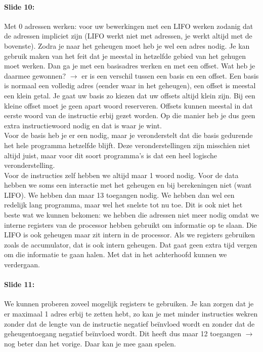 \documentclass[10pt,a4paper]{book}
\begin{document}
\paragraph{Slide 10:} Met 0 adressen werken: voor uw bewerkingen met een LIFO werken zodanig dat de adressen impliciet zijn (LIFO werkt niet met adressen, je werkt altijd met de bovenste). Zodra je naar het geheugen moet heb je wel een adres nodig. Je kan gebruik maken van het feit dat je meestal in hetzelfde gebied van het gehugen moet werken. Dan ga je met een basisadres werken en met een offset. Wat heb je daarmee gewonnen? $\rightarrow$ er is een verschil tussen een basis en een offset. Een basis is normaal een volledig adres (eender waar in het geheugen), een offset is meestal een klein getal. Je gaat uw basis zo kiezen dat uw offsets altijd klein zijn. Bij een kleine offset moet je geen apart woord reserveren. Offsets kunnen meestal in dat eerste woord van de instructie erbij gezet worden. Op die manier heb je dus geen extra instructiewoord nodig en dat is waar je wint.\\
Voor de basis heb je er een nodig, maar je veronderstelt dat die basis gedurende het hele programma hetzelfde blijft. Deze veronderstellingen zijn misschien niet altijd juist, maar voor dit soort programma's is dat een heel logische veronderstelling.\\
Voor de instructies zelf hebben we altijd maar 1 woord nodig. Voor de data hebben we soms een interactie met het geheugen en bij berekeningen niet (want LIFO). We hebben dan maar 13 toegangen nodig. We hebben dan wel een redelijk lang programma, maar wel het snelste tot nu toe. Dit is ook niet het beste wat we kunnen bekomen: we hebben die adressen niet meer nodig omdat we interne registers van de processor hebben gebruikt om informatie op te slaan. Die LIFO is ook geheugen maar zit intern in de processor. Als we registers gebruiken zoals de accumulator, dat is ook intern geheugen. Dat gaat geen extra tijd vergen om die informatie te gaan halen. Met dat in het achterhoofd kunnen we verdergaan.

\paragraph{Slide 11:} We kunnen proberen zoveel mogelijk registers te gebruiken. Je kan zorgen dat je er maximaal 1 adres erbij te zetten hebt, zo kan je met minder instructies wekren zonder dat de lengte van de instructie negatief be\"invloed wordt en zonder dat de geheugentoegang negatief be\"invloed wordt. Dit heeft dus maar 12 toegangen $\rightarrow$ nog beter dan het vorige. Daar kan je mee gaan spelen.
\end{document}
